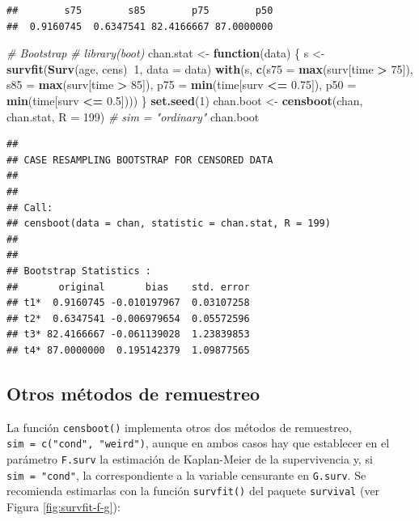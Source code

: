 \documentclass[]{book}
\newenvironment{Shaded}{\begin{snugshade}}{\end{snugshade}}
\newcommand{\KeywordTok}[1]{\textcolor[rgb]{0.13,0.29,0.53}{\textbf{#1}}}
\newcommand{\DataTypeTok}[1]{\textcolor[rgb]{0.13,0.29,0.53}{#1}}
\newcommand{\DecValTok}[1]{\textcolor[rgb]{0.00,0.00,0.81}{#1}}
\newcommand{\FloatTok}[1]{\textcolor[rgb]{0.00,0.00,0.81}{#1}}
\newcommand{\StringTok}[1]{\textcolor[rgb]{0.31,0.60,0.02}{#1}}
\newcommand{\CommentTok}[1]{\textcolor[rgb]{0.56,0.35,0.01}{\textit{#1}}}
\newcommand{\ControlFlowTok}[1]{\textcolor[rgb]{0.13,0.29,0.53}{\textbf{#1}}}
\newcommand{\OperatorTok}[1]{\textcolor[rgb]{0.81,0.36,0.00}{\textbf{#1}}}
\newcommand{\NormalTok}[1]{#1}
\theoremstyle{definition}
\theoremstyle{definition}
\theoremstyle{definition}
\theoremstyle{remark}
\begin{document}
\begin{verbatim}
##        s75        s85        p75        p50 
##  0.9160745  0.6347541 82.4166667 87.0000000
\end{verbatim}

\begin{Shaded}
\begin{Highlighting}[]
\CommentTok{# Bootstrap}
\CommentTok{# library(boot)}
\NormalTok{chan.stat <-}\StringTok{ }\ControlFlowTok{function}\NormalTok{(data) \{}
\NormalTok{    s <-}\StringTok{ }\KeywordTok{survfit}\NormalTok{(}\KeywordTok{Surv}\NormalTok{(age, cens)}\OperatorTok{~}\DecValTok{1}\NormalTok{, }\DataTypeTok{data =}\NormalTok{ data)}
    \KeywordTok{with}\NormalTok{(s, }\KeywordTok{c}\NormalTok{(}\DataTypeTok{s75 =} \KeywordTok{max}\NormalTok{(surv[time }\OperatorTok{>}\StringTok{ }\DecValTok{75}\NormalTok{]), }\DataTypeTok{s85 =} \KeywordTok{max}\NormalTok{(surv[time }\OperatorTok{>}\StringTok{ }\DecValTok{85}\NormalTok{]),}
            \DataTypeTok{p75 =} \KeywordTok{min}\NormalTok{(time[surv }\OperatorTok{<=}\StringTok{ }\FloatTok{0.75}\NormalTok{]), }\DataTypeTok{p50 =} \KeywordTok{min}\NormalTok{(time[surv }\OperatorTok{<=}\StringTok{ }\FloatTok{0.5}\NormalTok{])))}
\NormalTok{\}}
\KeywordTok{set.seed}\NormalTok{(}\DecValTok{1}\NormalTok{)}
\NormalTok{chan.boot <-}\StringTok{ }\KeywordTok{censboot}\NormalTok{(chan, chan.stat, }\DataTypeTok{R =} \DecValTok{199}\NormalTok{) }\CommentTok{# sim = "ordinary"}
\NormalTok{chan.boot}
\end{Highlighting}
\end{Shaded}

\begin{verbatim}
## 
## CASE RESAMPLING BOOTSTRAP FOR CENSORED DATA
## 
## 
## Call:
## censboot(data = chan, statistic = chan.stat, R = 199)
## 
## 
## Bootstrap Statistics :
##       original       bias    std. error
## t1*  0.9160745 -0.010197967  0.03107258
## t2*  0.6347541 -0.006979654  0.05572596
## t3* 82.4166667 -0.061139028  1.23839853
## t4* 87.0000000  0.195142379  1.09877565
\end{verbatim}

\subsection{Otros métodos de
remuestreo}\label{otros-metodos-de-remuestreo}

La función \texttt{censboot()} implementa otros dos métodos de
remuestreo, \texttt{sim\ =\ c("cond",\ "weird")}, aunque en ambos casos
hay que establecer en el parámetro \texttt{F.surv} la estimación de
Kaplan-Meier de la supervivencia y, si \texttt{sim\ =\ "cond"}, la
correspondiente a la variable censurante en \texttt{G.surv}. Se
recomienda estimarlas con la función \texttt{survfit()} del paquete
\texttt{survival} (ver Figura \ref{fig:survfit-f-g}):
\end{document}
